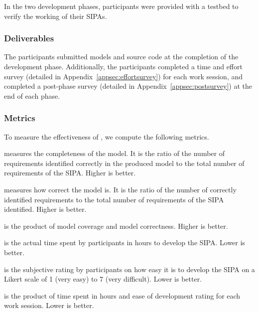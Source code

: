 In the two development phases, participants were provided with a testbed
to verify the working of their SIPAs.

\subsubsection*{Deliverables}

The participants submitted models and source code at the completion of
the development phase. Additionally, the participants completed a time
and effort survey (detailed in Appendix~\ref{appsec:effortsurvey}) for
each work session, and completed a post-phase survey (detailed in
Appendix~\ref{appsec:postsurvey}) at the end of each phase.

\subsubsection*{Metrics}

To measure the effectiveness of \frameworkA, we compute the following metrics.

\begin{description}[leftmargin=1em]
\item[Model coverage] measures the completeness of the model. It is the
ratio of the number of requirements identified correctly in the produced
model to the total number of requirements of the SIPA. Higher is better.

\item[Model correctness] measures how correct the model is.  It is the
ratio of the number of correctly identified requirements to the total
number of requirements of the SIPA identified.  Higher is better.

\item[Model quality] is the product of model coverage and model
correctness. Higher is better.

\item[Time to develop] is the actual time spent by participants in hours
to develop the SIPA.  Lower is better.

\item[Difficulty of development] is the subjective rating by
participants on how easy it is to develop the SIPA on a Likert scale of
1 (very easy) to 7 (very difficult). Lower is better.

\item[Effort to develop] is the product of time spent in hours and ease
of development rating for each work session. Lower is better.
\end{description}


